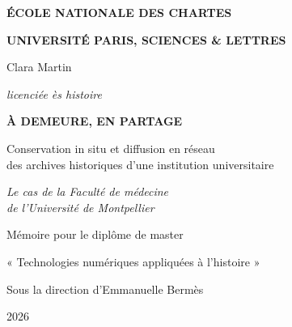 
\begin{titlepage}
	\centering
	\thispagestyle{empty}
	
	{\large\textbf{ÉCOLE NATIONALE DES CHARTES}\par}
	\vspace{0.25cm}
	{\large\textbf{UNIVERSITÉ PARIS, SCIENCES \& LETTRES}\par}
	
	\vspace{2cm}
	
	{\Large Clara Martin\par}
	\vspace{0.2cm}
	{\large\itshape licenciée ès histoire\par}
	
	\vspace{2cm}
	
{\Huge\bfseries
	À DEMEURE, EN PARTAGE\par}

\vspace{0.9cm}

{\Large
	Conservation in situ et diffusion en réseau\\[0.15cm]
	des archives historiques d'une institution universitaire\par}

\vspace{1.2cm}

{\large\itshape
	Le cas de la Faculté de médecine\\
	de l'Université de Montpellier\par}
	
	\vfill
	
	{\large Mémoire pour le diplôme de master\par}
	\vspace{0.2cm}
	{\large « Technologies numériques appliquées à l'histoire »\par}
	
	\vspace{1.1cm}
	
	{\large Sous la direction d'Emmanuelle Bermès\par}
	
	\vspace{1.1cm}
	
	{\Large 2026\par}
	
\end{titlepage}